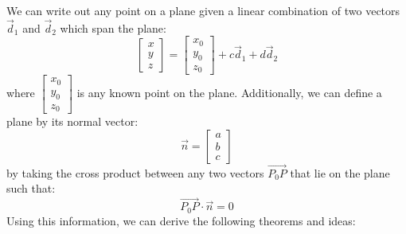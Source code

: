 \documentclass{article}
\begin{document}
We can write out any point on a plane given a linear combination of two vectors $\vec{d}_1$ and $\vec{d}_2$ which span the plane:
\begin{equation}
    \begin{bmatrix}
        x\\y\\z
    \end{bmatrix}=\begin{bmatrix}
        x_0\\y_0\\z_0
    \end{bmatrix}+c\vec{d}_1+d\vec{d}_2
    \label{eq:}
\end{equation}
where $\begin{bmatrix}
    x_0\\y_0\\z_0
\end{bmatrix}$ is any known point on the plane. Additionally, we can define a plane by its normal vector:
\begin{equation}
    \vec{n}=\begin{bmatrix}
        a\\b\\c
    \end{bmatrix}
    \label{eq:}
\end{equation}
by taking the cross product between any two vectors $\overrightarrow{P_0P}$ that lie on the plane such that:
\begin{equation}
    \overrightarrow{P_0P} \cdot \vec{n} = 0
    \label{eq:}
\end{equation}
Using this information, we can derive the following theorems and ideas:
\end{document}
